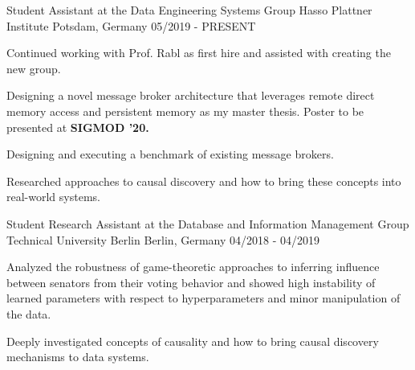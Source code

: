 

\begin{cventries}

  \cventry
    {Student Assistant at the Data Engineering Systems Group} %
    {Hasso Plattner Institute} %
    {Potsdam, Germany} %
    {05/2019 - PRESENT} %
    {
      \begin{cvitems} %
      \item{Continued working with Prof. Rabl as first hire and assisted with creating the new group.}
      \item{Designing a novel message broker architecture that leverages remote direct memory access and persistent memory as my master thesis. Poster to be presented at \textbf{SIGMOD '20.}}
      \item{Designing and executing a benchmark of existing message brokers.}
      \item{Researched approaches to causal discovery and how to bring these concepts into real-world systems.}
      \end{cvitems}
    }

  \cventry
    {Student Research Assistant at the Database and Information Management Group} %
    {Technical University Berlin} %
    {Berlin, Germany} %
    {04/2018 - 04/2019} %
    {
      \begin{cvitems} %
      \item{Analyzed the robustness of game-theoretic approaches to inferring influence between senators from their voting behavior and showed high instability of learned parameters with respect to hyperparameters and minor manipulation of the data.}
      \item{Deeply investigated concepts of causality and how to bring causal discovery mechanisms to data systems.}
      \end{cvitems}
    }


\end{cventries}
